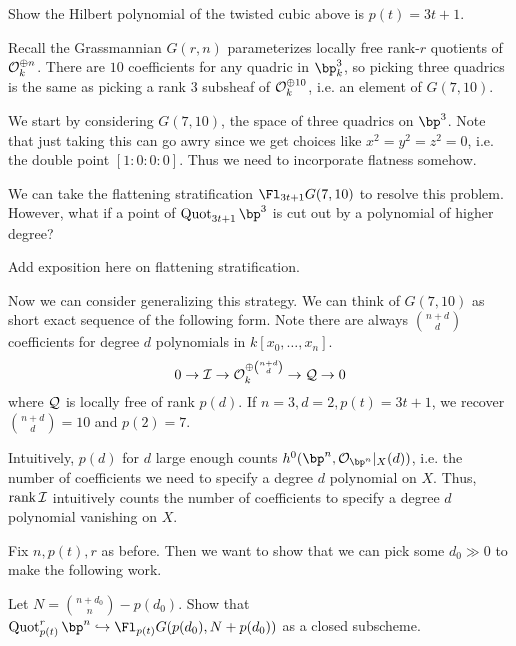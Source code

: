 \documentclass[12pt]{article}
\begin{document}
\begin{exer}
  Show the Hilbert polynomial of the twisted cubic above is $p(t) = 3t+1$.
\end{exer}

Recall the Grassmannian $G(r,n)$ parameterizes locally free rank-$r$ quotients of $\mathcal{O}^{\oplus n}_{k}$. There are $10$ coefficients for any quadric in $\bp^3_k$, so picking three quadrics is the same as picking a rank $3$ subsheaf of $\mathcal{O}^{\oplus 10}_k$, i.e. an element of $G(7,10)$. 

We start by considering $G(7,10)$, the space of three quadrics on $\bp^3$. Note that just taking this can go awry since we get choices like $x^2 = y^2 = z^2 = 0$, i.e. the double point $[1 : 0 : 0 : 0]$. Thus we need to incorporate flatness somehow.

\begin{question}
  We can take the flattening stratification $\Fl_{3t+1} G(7,10)$ to resolve this problem. However, what if a point of $\Quot_{3t+1} \bp^3$ is cut out by a polynomial of higher degree?
\end{question}

\begin{todo}
  Add exposition here on flattening stratification.
\end{todo}

Now we can consider generalizing this strategy. We can think of $G(7,10)$ as short exact sequence of the following form. Note there are always $\binom{n+d}{d}$ coefficients for degree $d$ polynomials in $k[x_0,\ldots,x_n]$.
\[0 \to \mathcal{I} \to \mathcal{O}_k^{\oplus \binom{n+d}{d}} \to \mathcal{Q} \to 0\]
where $\mathcal{Q}$ is locally free of rank $p(d)$. If $n = 3, d = 2, p(t) = 3t+1$, we recover $\binom{n+d}{d} = 10$ and $p(2) = 7$. 

\begin{rem}
  Intuitively, $p(d)$ for $d$ large enough counts $h^0(\bp^n, \calo_{\bp^n} \vert_X(d))$, i.e. the number of coefficients we need to specify a degree $d$ polynomial on $X$. Thus, $\operatorname{rank} \mathcal{I}$ intuitively counts the number of coefficients to specify a degree $d$ polynomial vanishing on $X$.
\end{rem}

Fix $n,p(t),r$ as before. Then we want to show that we can pick some $d_0 \gg 0$ to make the following work.

\begin{todo}
  Let $N = \binom{n+d_0}{n} - p(d_0)$. Show that $\Quot^r_{p(t)} \bp^n \hookrightarrow \Fl_{p(t)} G(p(d_0), N+p(d_0))$ as a closed subscheme.
\end{todo}
\end{document}
